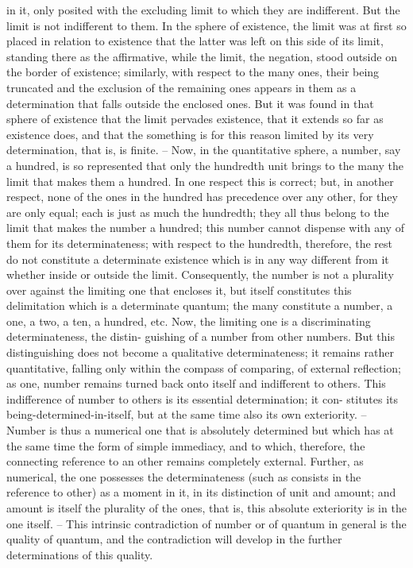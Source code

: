 in it, only posited with the excluding limit to which they are indifferent.
But the limit is not indifferent to them. In the sphere of existence, the
limit was at first so placed in relation to existence that the latter was left on
this side of its limit, standing there as the affirmative, while the limit, the
negation, stood outside on the border of existence; similarly, with respect
to the many ones, their being truncated and the exclusion of the remaining
ones appears in them as a determination that falls outside the enclosed
ones. But it was found in that sphere of existence that the limit pervades
existence, that it extends so far as existence does, and that the something is
for this reason limited by its very determination, that is, is finite. – Now,
in the quantitative sphere, a number, say a hundred, is so represented that
only the hundredth unit brings to the many the limit that makes them a
hundred. In one respect this is correct; but, in another respect, none of the
ones in the hundred has precedence over any other, for they are only equal;
each is just as much the hundredth; they all thus belong to the limit that
makes the number a hundred; this number cannot dispense with any of
them for its determinateness; with respect to the hundredth, therefore, the
rest do not constitute a determinate existence which is in any way different
from it whether inside or outside the limit. Consequently, the number
is not a plurality over against the limiting one that encloses it, but itself
constitutes this delimitation which is a determinate quantum; the many
constitute a number, a one, a two, a ten, a hundred, etc.
Now, the limiting one is a discriminating determinateness, the distin-
guishing of a number from other numbers. But this distinguishing does
not become a qualitative determinateness; it remains rather quantitative,
falling only within the compass of comparing, of external reflection; as
one, number remains turned back onto itself and indifferent to others.
This indifference of number to others is its essential determination; it con-
stitutes its being-determined-in-itself, but at the same time also its own
exteriority. – Number is thus a numerical one that is absolutely determined
but which has at the same time the form of simple immediacy, and to
which, therefore, the connecting reference to an other remains completely
external. Further, as numerical, the one possesses the determinateness (such
as consists in the reference to other) as a moment in it, in its distinction
of unit and amount; and amount is itself the plurality of the ones, that is,
this absolute exteriority is in the one itself. – This intrinsic contradiction
of number or of quantum in general is the quality of quantum, and the
contradiction will develop in the further determinations of this quality.

